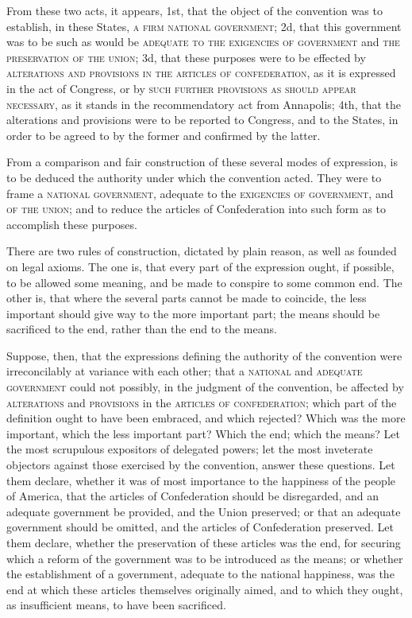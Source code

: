 From these two acts, it appears, 1st, that the object of the convention was to establish, in these States, \textsc{a firm national government}; 2d, that this government was to be such as would be \textsc{adequate to the exigencies of government} and \textsc{the preservation of the union}; 3d, that these purposes were to be effected by \textsc{alterations and provisions in the articles of confederation}, as it is expressed in the act of Congress, or by \textsc{such further provisions as should appear necessary}, as it stands in the recommendatory act from Annapolis; 4th, that the alterations and provisions were to be reported to Congress, and to the States, in order to be agreed to by the former and confirmed by the latter.

From a comparison and fair construction of these several modes of expression, is to be deduced the authority under which the convention acted. They were to frame a \textsc{national government}, adequate to the \textsc{exigencies of government}, and \textsc{of the union}; and to reduce the articles of Confederation into such form as to accomplish these purposes.

There are two rules of construction, dictated by plain reason, as well as founded on legal axioms. The one is, that every part of the expression ought, if possible, to be allowed some meaning, and be made to conspire to some common end. The other is, that where the several parts cannot be made to coincide, the less important should give way to the more important part; the means should be sacrificed to the end, rather than the end to the means.

Suppose, then, that the expressions defining the authority of the convention were irreconcilably at variance with each other; that a \textsc{national} and \textsc{adequate government} could not possibly, in the judgment of the convention, be affected by \textsc{alterations} and \textsc{provisions} in the \textsc{articles of confederation}; which part of the definition ought to have been embraced, and which rejected? Which was the more important, which the less important part? Which the end; which the means? Let the most scrupulous expositors of delegated powers; let the most inveterate objectors against those exercised by the convention, answer these questions. Let them declare, whether it was of most importance to the happiness of the people of America, that the articles of Confederation should be disregarded, and an adequate government be provided, and the Union preserved; or that an adequate government should be omitted, and the articles of Confederation preserved. Let them declare, whether the preservation of these articles was the end, for securing which a reform of the government was to be introduced as the means; or whether the establishment of a government, adequate to the national happiness, was the end at which these articles themselves originally aimed, and to which they ought, as insufficient means, to have been sacrificed.

